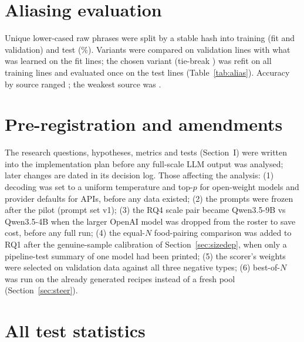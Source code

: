\documentclass[conference]{IEEEtran}
\begin{document}
\section{Aliasing evaluation}\label{app:alias}
Unique lower-cased raw phrases were split by a stable hash into training (fit and validation) and test (\NAliasTestShare\%). Variants were compared on validation lines with what was learned on the fit lines; the chosen variant (tie-break \NAliasChosen) was refit on all training lines and evaluated once on the test lines (Table~\ref{tab:alias}). Accuracy by source ranged \NAliasSourceRange; the weakest source was \NAliasWorstSource.
\begin{table}[t]
\centering\caption{Aliaser variants (validation) and the held-out test result. $^\ast$\,chosen.}\label{tab:alias}
\scriptsize\setlength{\tabcolsep}{3pt}
\end{table}

\section{Pre-registration and amendments}\label{app:prereg}
The research questions, hypotheses, metrics and tests (Section~I) were written into the implementation plan before any full-scale LLM output was analysed; later changes are dated in its decision log. Those affecting the analysis: (1) decoding was set to a uniform temperature \NTemperature{} and top-$p$ \NTopP{} for open-weight models and provider defaults for APIs, before any data existed; (2) the prompts were frozen after the pilot (prompt set v1); (3) the RQ4 scale pair became Qwen3.5-9B vs Qwen3.5-4B when the larger OpenAI model was dropped from the roster to save cost, before any full run; (4) the equal-$N$ food-pairing comparison was added to RQ1 after the genuine-sample calibration of Section~\ref{sec:sizedep}, when only a pipeline-test summary of one model had been printed; (5) the scorer's weights were selected on validation data against all three negative types; (6) best-of-$N$ was run on the already generated recipes instead of a fresh pool (Section~\ref{sec:steer}).

\section{All test statistics}\label{app:tests}
\begin{table}[t]
\centering\caption{Every pre-registered and exploratory test (\texttt{tables/rq\_tests\_full.csv}); $p_{\mathrm{BH}}$ within each test across models.}\label{tab:rqfull}
\tiny\setlength{\tabcolsep}{3pt}
\end{table}
\end{document}
